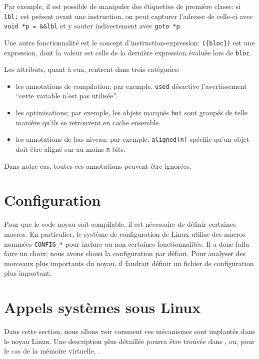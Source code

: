 Par exemple, il est possible de manipuler des étiquettes de première classe: si
\texttt{lbl:} est présent avant une instruction, on peut capturer l'adresse de
celle-ci avec \texttt{void *p = \&\&lbl} et y sauter indirectement avec
\texttt{goto *p}.

Une autre fonctionnalité est le concept d'instruction-expression:
\texttt{(\{bloc\})} est une expression, dont la valeur est celle de la dernière
expression évaluée lors de \texttt{bloc}.

Les attributs, quant à eux, rentrent dans trois catégories:

\begin{itemize}
  \item les annotations de compilation; par exemple, \texttt{used} désactive
  l'avertissement \enquote{cette variable n'est pas utilisée}.

  \item les optimisations; par exemple, les objets marqués \texttt{hot} sont
    groupés de telle manière qu'ils se retrouvent en cache ensemble.

  \item les annotations de bas niveau; par exemple, \verb!aligned(n)!
    spécifie qu'un objet doit être aligné sur au moins \texttt{n} bits.
\end{itemize}

Dans notre cas, toutes ces annotations peuvent être ignorées.

\section{Configuration}

Pour que le code noyau soit compilable, il est nécessaire de définir certaines
macros. En particulier, le système de configuration de Linux utilise des macros
nommées \texttt{CONFIG\_*} pour inclure ou non certaines fonctionnalités. Il a
donc fallu faire un choix; nous avons choisi la configuration par défaut. Pour
analyser des morceaux plus importants du noyau, il faudrait définir un fichier
de configuration plus important.

\section{Appels systèmes sous Linux}
\label{sec:linux-sys}

Dans cette section, nous allons voir comment ces mécanismes sont implantés dans
le noyau Linux. Une description plus détaillée pourra être trouvée dans
\cite{UnderstandingTheLinuxKernel}, ou, pour le cas de la mémoire virtuelle,
\cite{LinuxVMM}.

